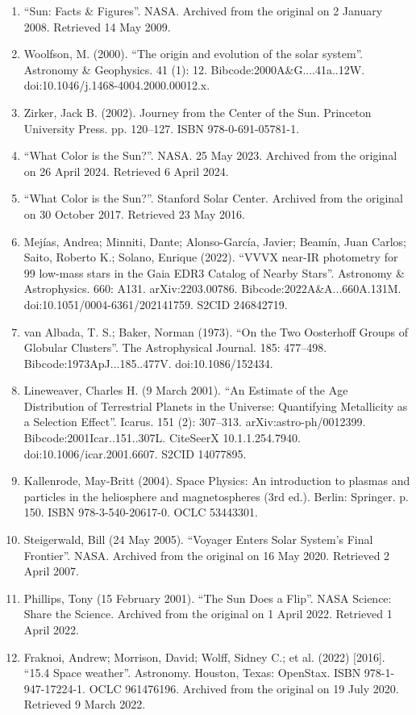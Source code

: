 \begin{enumerate}
\item ``Sun: Facts \& Figures''. NASA. Archived from the original on 2 January 2008. Retrieved 14 May 2009.
\item Woolfson, M. (2000). ``The origin and evolution of the solar system''. Astronomy \& Geophysics. 41 (1): 12. Bibcode:2000A\&G....41a..12W. doi:10.1046/j.1468-4004.2000.00012.x.
\item Zirker, Jack B. (2002). Journey from the Center of the Sun. Princeton University Press. pp. 120–127. ISBN 978-0-691-05781-1.
\item ``What Color is the Sun?''. NASA. 25 May 2023. Archived from the original on 26 April 2024. Retrieved 6 April 2024.
\item ``What Color is the Sun?''. Stanford Solar Center. Archived from the original on 30 October 2017. Retrieved 23 May 2016.
\item Mejías, Andrea; Minniti, Dante; Alonso-García, Javier; Beamín, Juan Carlos; Saito, Roberto K.; Solano, Enrique (2022). ``VVVX near-IR photometry for 99 low-mass stars in the Gaia EDR3 Catalog of Nearby Stars''. Astronomy \& Astrophysics. 660: A131. arXiv:2203.00786. Bibcode:2022A\&A...660A.131M. doi:10.1051/0004-6361/202141759. S2CID 246842719.
\item van Albada, T. S.; Baker, Norman (1973). ``On the Two Oosterhoff Groups of Globular Clusters''. The Astrophysical Journal. 185: 477–498. Bibcode:1973ApJ...185..477V. doi:10.1086/152434.
\item Lineweaver, Charles H. (9 March 2001). ``An Estimate of the Age Distribution of Terrestrial Planets in the Universe: Quantifying Metallicity as a Selection Effect''. Icarus. 151 (2): 307–313. arXiv:astro-ph/0012399. Bibcode:2001Icar..151..307L. CiteSeerX 10.1.1.254.7940. doi:10.1006/icar.2001.6607. S2CID 14077895.
\item Kallenrode, May-Britt (2004). Space Physics: An introduction to plasmas and particles in the heliosphere and magnetospheres (3rd ed.). Berlin: Springer. p. 150. ISBN 978-3-540-20617-0. OCLC 53443301.
\item Steigerwald, Bill (24 May 2005). ``Voyager Enters Solar System's Final Frontier''. NASA. Archived from the original on 16 May 2020. Retrieved 2 April 2007.
\item Phillips, Tony (15 February 2001). ``The Sun Does a Flip''. NASA Science: Share the Science. Archived from the original on 1 April 2022. Retrieved 1 April 2022.
\item Fraknoi, Andrew; Morrison, David; Wolff, Sidney C.; et al. (2022) [2016]. ``15.4 Space weather''. Astronomy. Houston, Texas: OpenStax. ISBN 978-1-947-17224-1. OCLC 961476196. Archived from the original on 19 July 2020. Retrieved 9 March 2022.

\end{enumerate}
